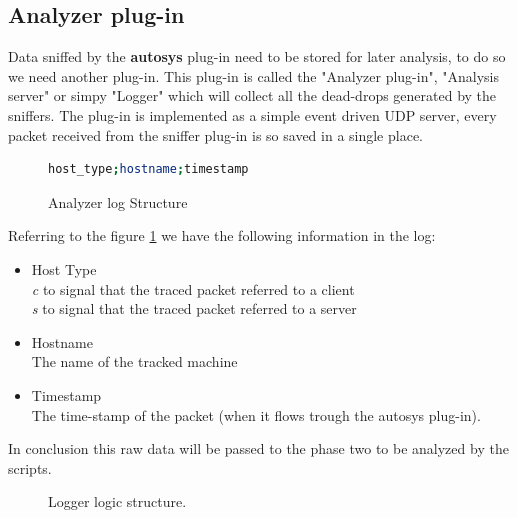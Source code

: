 \subsection{Analyzer plug-in}
Data sniffed by the \textbf{autosys} plug-in need to be stored for later analysis, 
to do so we need another plug-in.
This plug-in is called the "Analyzer plug-in", "Analysis server" or simpy "Logger"
which will collect all the dead-drops generated by the sniffers.
The plug-in is implemented as a simple event driven UDP server, every
packet received from the sniffer plug-in is so saved in a single place.
\begin{figure}[H]
\begin{lstlisting}[language=bash,frame=single]
host_type;hostname;timestamp
\end{lstlisting}
\caption{Analyzer log Structure}
\label{fig:analyzer_pack_struct}
\end{figure}
Referring to the figure \ref{fig:analyzer_pack_struct} we have the following
information in the log:
\begin{itemize}
\item Host Type \hfill \\
\emph{c} to signal that the traced packet referred to a client\\
\emph{s} to signal that the traced packet referred to a server
\item Hostname \hfill \\
The name of the tracked machine
\item Timestamp \hfill \\
The time-stamp of the packet (when it flows trough the autosys plug-in).
\end{itemize}

In conclusion this raw data will be passed to the phase two to be analyzed by the scripts.\\
\begin{figure}[H]
\centering
{}
\caption {Logger logic structure.}
\label{fig:autosys_diagram}
\end{figure}

